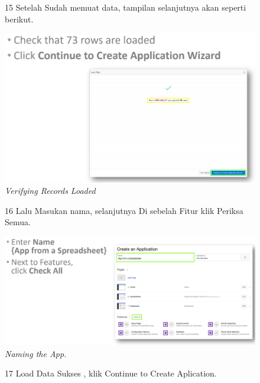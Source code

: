 \begin{enumerate}
\begin{figure}
\item[15] Setelah Sudah memuat data, tampilan selanjutnya akan seperti berikut.

    \begin{center}
\includegraphics[scale=0.5]{figures/8.PNG}
    \caption{\textit{Verifying Records Loaded}}
        \end{center}
\label{gambar}
\end{figure}

\begin{figure}
\item[16] Lalu Masukan nama, selanjutnya Di sebelah Fitur klik Periksa Semua.

    \begin{center}
\includegraphics[scale=0.4]{figures/9.PNG}
    \caption{\textit{Naming the App.}}
        \end{center}
\label{gambar}
\end{figure}

\begin{figure}
\item[17] Load Data Sukses , klik Continue to Create Aplication.


\end{figure}
\end{enumerate}
